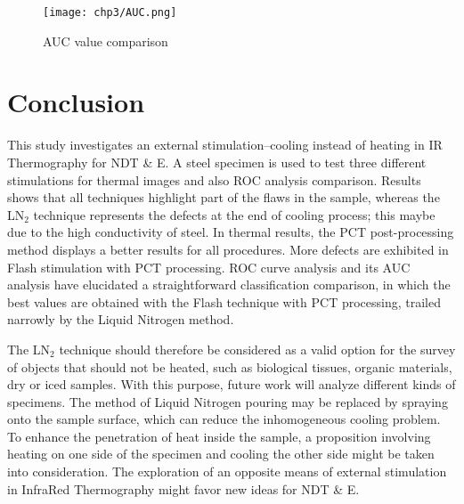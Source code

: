               
\begin{figure}[htpb]
   \centering
   \texttt{[image: chp3/AUC.png]}
   \caption{AUC value comparison}
   \label{fig_auc}
\end{figure}




\section{Conclusion} %
\label{sec:conclusion}
This study investigates an external stimulation--cooling instead of heating in IR Thermography for NDT \& E. 
A steel specimen is used to test three different stimulations for thermal images and also ROC analysis comparison. 
Results shows that all techniques highlight part of the flaws in the sample, whereas the LN$_2$ technique represents the defects at the end of cooling process; this maybe due to the high conductivity of steel. 
In thermal results, the PCT post-processing method displays a better results for all procedures. More defects are exhibited in Flash stimulation with PCT processing.
ROC curve analysis and its AUC analysis have elucidated a straightforward classification comparison, in which the best values are obtained with the Flash technique with PCT processing, trailed narrowly by the Liquid Nitrogen method.


The LN$_2$ technique should therefore be considered as a valid option for the survey of objects that should not be heated, such as biological tissues, organic materials, dry or iced samples. With this purpose, future work will analyze different kinds of specimens.
The method of Liquid Nitrogen pouring may be replaced by spraying onto the sample surface, which can reduce the inhomogeneous cooling problem. To enhance the penetration of heat inside the sample, a proposition involving heating on one side of the specimen and cooling the other side might be taken into consideration.
The exploration of an opposite means of external stimulation in InfraRed Thermography might favor new ideas 
for NDT \& E.


